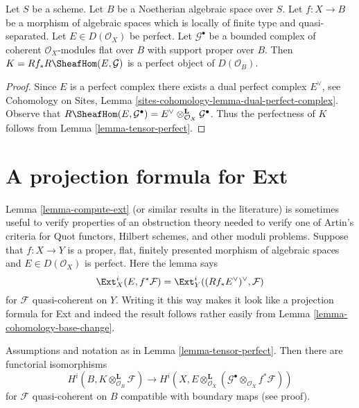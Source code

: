 \begin{lemma}
\label{lemma-ext-perfect}
Let $S$ be a scheme. Let $B$ be a Noetherian algebraic space over $S$.
Let $f : X \to B$ be a morphism of algebraic spaces which is locally of
finite type and quasi-separated. Let $E \in D(\mathcal{O}_X)$ be perfect.
Let $\mathcal{G}^\bullet$ be a bounded complex of coherent
$\mathcal{O}_X$-modules flat over $B$ with support proper over $B$. Then
$K = Rf_*R\SheafHom(E, \mathcal{G})$ is a perfect object of $D(\mathcal{O}_B)$.
\end{lemma}

\begin{proof}
Since $E$ is a perfect complex there exists a dual perfect complex
$E^\vee$, see Cohomology on Sites, Lemma
\ref{sites-cohomology-lemma-dual-perfect-complex}.
Observe that $R\SheafHom(E, \mathcal{G}^\bullet) =
E^\vee \otimes^\mathbf{L}_{\mathcal{O}_X} \mathcal{G}^\bullet$.
Thus the perfectness of $K$ follows from Lemma \ref{lemma-tensor-perfect}.
\end{proof}






\section{A projection formula for Ext}
\label{section-ext}

\noindent
Lemma \ref{lemma-compute-ext} (or similar results in the literature)
is sometimes useful to verify properties of an obstruction theory needed
to verify one of Artin's criteria
for Quot functors, Hilbert schemes, and other moduli problems.
Suppose that $f : X \to Y$ is a proper, flat, finitely presented
morphism of algebraic spaces and $E \in D(\mathcal{O}_X)$ is perfect.
Here the lemma says
$$
\Ext^i_X(E, f^*\mathcal{F}) =
\Ext^i_Y((Rf_*E^\vee)^\vee, \mathcal{F})
$$
for $\mathcal{F}$ quasi-coherent on $Y$.
Writing it this way makes it look like a projection formula
for Ext and indeed the result follows rather
easily from Lemma \ref{lemma-cohomology-base-change}.

\begin{lemma}
\label{lemma-compute-tensor-perfect}
Assumptions and notation as in Lemma \ref{lemma-tensor-perfect}.
Then there are functorial isomorphisms
$$
H^i(B, K \otimes^\mathbf{L}_{\mathcal{O}_B} \mathcal{F})
\longrightarrow
H^i(X, E \otimes^\mathbf{L}_{\mathcal{O}_X}
(\mathcal{G}^\bullet \otimes_{\mathcal{O}_X} f^*\mathcal{F}))
$$
for $\mathcal{F}$ quasi-coherent on $B$
compatible with boundary maps (see proof).
\end{lemma}

